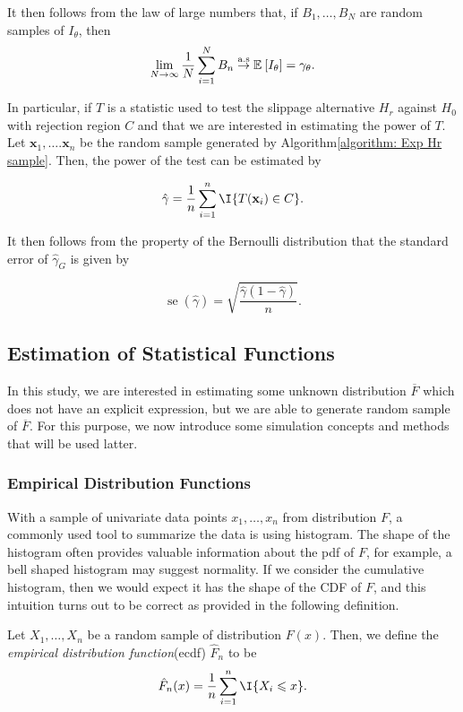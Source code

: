 \documentclass{report}
\DeclareMathOperator{\se}{se}
\begin{document}
 It then follows from the law of large numbers that, if $B_1,\ldots, B_N$ are random samples of $I_\theta$, then
 \[ 
     \lim_{N \to \infty} \frac{1}{N} \sum\limits_{i=1}^{N} B_n \stackrel{\mathrm{a.s}}{\to} \mathbb{E}_{} \left[ I_\theta \right] = \gamma_\theta.
 \]

In particular, if $T$ is a statistic used to test the slippage alternative $H_r$ against $H_0$ with rejection region $C$ and that we are interested in
estimating the power of $T$. Let $\mathbf x_1,\ldots. \mathbf x_n$ be the random sample generated by Algorithm\ref{algorithm: Exp Hr sample}. Then,
the power of the test can be estimated by

\[ 
    \hat \gamma =  \frac{1}{n} \sumi{n} \I{T(\mathbf x_i) \in C}.
\]

It then follows from the property of the Bernoulli distribution that the standard error of $\hat \gamma_G$ is given by

\[ 
    \se(\hat \gamma) = \sqrt{\frac{\hat\gamma(1- \hat \gamma )}{n}}.
\]

\subsection{Estimation of Statistical Functions}

In this study, we are interested in estimating some unknown distribution $\overline F$ which does not have an explicit expression, but we are able to generate random sample of $\overline F$.
For this purpose, we now introduce some simulation concepts and methods that will be used latter.

\subsubsection{Empirical Distribution Functions}

With a sample of univariate data points $x_1,\ldots,x_n$ from distribution $F$, a commonly used tool to summarize the data is using histogram. 
The shape of the histogram often provides valuable information about the pdf of $F$,
for example, a bell shaped histogram may suggest normality. If we consider the cumulative histogram, then we would expect it has the shape of the CDF of $F$, and this intuition
turns out to be correct as provided in the following definition.

\begin{defn}\label{defn:ecdf}
Let $X_1,\ldots,X_n$ be a random sample of distribution $F(x)$. Then, we define the \emph{empirical distribution function}(ecdf) $\hat F_n$ to be
    \[ 
        \hat F_n(x) = \frac{1}{n} \sumi{n} \I{X_i \leqslant x}.
    \]
\end{defn}
\end{document}
